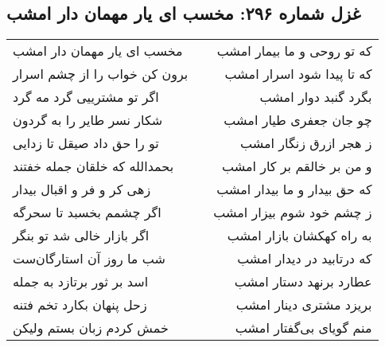 \begin{center}
\section*{غزل شماره ۲۹۶: مخسب ای یار مهمان دار امشب}
\label{sec:0296}
\begin{longtable}{l p{0.5cm} r}
مخسب ای یار مهمان دار امشب
&&
که تو روحی و ما بیمار امشب
\\
برون کن خواب را از چشم اسرار
&&
که تا پیدا شود اسرار امشب
\\
اگر تو مشترییی گرد مه گرد
&&
بگرد گنبد دوار امشب
\\
شکار نسر طایر را به گردون
&&
چو جان جعفری طیار امشب
\\
تو را حق داد صیقل تا زدایی
&&
ز هجر ازرق زنگار امشب
\\
بحمدالله که خلقان جمله خفتند
&&
و من بر خالقم بر کار امشب
\\
زهی کر و فر و اقبال بیدار
&&
که حق بیدار و ما بیدار امشب
\\
اگر چشمم بخسبد تا سحرگه
&&
ز چشم خود شوم بیزار امشب
\\
اگر بازار خالی شد تو بنگر
&&
به راه کهکشان بازار امشب
\\
شب ما روز آن استارگان‌ست
&&
که درتابید در دیدار امشب
\\
اسد بر ثور برتازد به جمله
&&
عطارد برنهد دستار امشب
\\
زحل پنهان بکارد تخم فتنه
&&
بریزد مشتری دینار امشب
\\
خمش کردم زبان بستم ولیکن
&&
منم گویای بی‌گفتار امشب
\\
\end{longtable}
\end{center}

